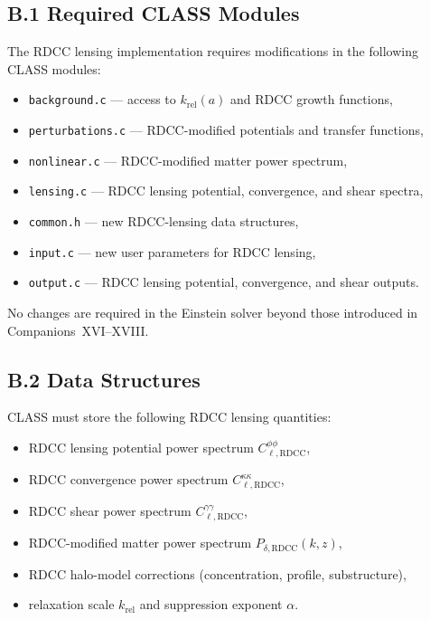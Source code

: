 \documentclass[11pt,a4paper]{article}
\begin{document}
\subsection*{B.1 Required CLASS Modules}

The RDCC lensing implementation requires modifications in the following CLASS modules:

\begin{itemize}
\item \texttt{background.c} — access to $k_{\mathrm{rel}}(a)$ and RDCC growth functions,
\item \texttt{perturbations.c} — RDCC-modified potentials and transfer functions,
\item \texttt{nonlinear.c} — RDCC-modified matter power spectrum,
\item \texttt{lensing.c} — RDCC lensing potential, convergence, and shear spectra,
\item \texttt{common.h} — new RDCC-lensing data structures,
\item \texttt{input.c} — new user parameters for RDCC lensing,
\item \texttt{output.c} — RDCC lensing potential, convergence, and shear outputs.
\end{itemize}

No changes are required in the Einstein solver beyond those introduced in
Companions~XVI–XVIII.

\subsection*{B.2 Data Structures}

CLASS must store the following RDCC lensing quantities:

\begin{itemize}
\item RDCC lensing potential power spectrum $C_{\ell,\mathrm{RDCC}}^{\phi\phi}$,
\item RDCC convergence power spectrum $C_{\ell,\mathrm{RDCC}}^{\kappa\kappa}$,
\item RDCC shear power spectrum $C_{\ell,\mathrm{RDCC}}^{\gamma\gamma}$,
\item RDCC-modified matter power spectrum $P_{\delta,\mathrm{RDCC}}(k,z)$,
\item RDCC halo-model corrections (concentration, profile, substructure),
\item relaxation scale $k_{\mathrm{rel}}$ and suppression exponent $\alpha$.
\end{itemize}
\end{document}
